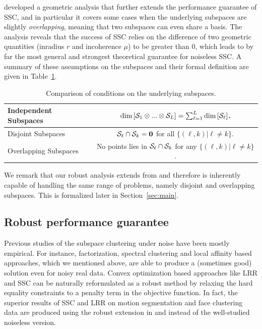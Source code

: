 \documentclass{ctexart}
\begin{document}
\cite{soltanolkotabi2011geometric} developed a geometric analysis that further extends the performance guarantee of SSC, and in particular it covers some cases when the underlying subspaces are slightly \emph{overlapping}, meaning that two subspaces can even share a basis. The analysis reveals that the success of SSC relies on the difference of two geometric quantities (inradius $r$ and incoherence $\mu$) to be greater than $0$, which leads to by far the most general and strongest theoretical guarantee for noiseless SSC. A summary of these assumptions on the subspaces and their formal definition are given in Table~\ref{tab:subspaces}.
\begin{table}
  \centering
\begin{tabular}{|l|c|}
  \hline
  Independent Subspaces & $\mathrm{dim}\left[\mathcal{S}_1\otimes...\otimes \mathcal{S}_L\right] = \sum_{\ell=1}^L \mathrm{dim}\left[\mathcal{S}_\ell\right]  $.  \\\hline
  Disjoint Subspaces &  $\mathcal{S}_\ell\cap \mathcal{S}_k =\mathbf{0}$ for all $\{(\ell,k)|\ell\neq k\}$.\\\hline
  Overlapping Subspaces & No points lies in $\mathcal{S}_\ell\cap \mathcal{S}_k$ for any $\{(\ell,k)|\ell\neq k\}$.\\
  \hline
\end{tabular}
\caption{Comparison of conditions on the underlying subspaces.}\label{tab:subspaces}
\end{table}



We remark that our robust analysis extends from \cite{soltanolkotabi2011geometric} and therefore is inherently capable of handling the same range of problems, namely disjoint and overlapping subspaces. This is formalized later in Section~\ref{sec:main}.

\subsection{Robust performance guarantee}

Previous studies of the subspace clustering under noise have been mostly empirical. For instance, factorization, spectral clustering and local affinity based approaches, which we mentioned above, are able to produce a (sometimes good) solution even for noisy real data. Convex optimization based approaches like LRR and SSC can be naturally reformulated as a robust method by relaxing the hard equality constraints to a penalty term in the objective function. In fact, the superior results of SSC and LRR on motion segmentation and face clustering data are produced using the robust extension in \cite{elhamifar2009ssc} and \cite{liu2010lrr_icml} instead of the well-studied noiseless version.
\end{document}

